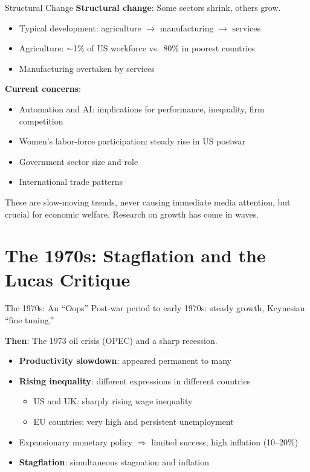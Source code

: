 \documentclass[blue]{beamer}
\begin{document}
\begin{frame}{Structural Change}
	\textbf{Structural change}: Some sectors shrink, others grow.
		\vspace{-6pt}
	\begin{itemize}
		\item Typical development: agriculture $\to$ manufacturing $\to$ services
		\item Agriculture: $\sim$1\% of US workforce vs.\ 80\% in poorest countries
		\item Manufacturing overtaken by services
	\end{itemize}

	\textbf{Current concerns}:
		\vspace{-6pt}
	\begin{itemize}
		\item Automation and AI: implications for performance, inequality, firm competition
		\item Women's labor-force participation: steady rise in US postwar 
		\item Government sector size and role
		\item International trade patterns
	\end{itemize}
	

	These are slow-moving trends, never causing immediate media attention, but crucial for economic welfare. Research on growth has come in waves.
\end{frame}

\section{The 1970s: Stagflation and the Lucas Critique}

\begin{frame}{The 1970s: An ``Oops''}
	Post-war period to early 1970s: steady growth, Keynesian ``fine tuning.''
	
	\bigskip
	\textbf{Then}: The 1973 oil crisis (OPEC) and a sharp recession.
	\begin{itemize}
		\item \textbf{Productivity slowdown}: appeared permanent to many
		\item \textbf{Rising inequality}: different expressions in different countries
		\begin{itemize}
			\item US and UK: sharply rising wage inequality
			\item EU countries: very high and persistent unemployment
		\end{itemize}
		\item Expansionary monetary policy $\Rightarrow$ limited success; high inflation (10--20\%)
		\item \textbf{Stagflation}: simultaneous stagnation and inflation
	\end{itemize}
\end{frame}
\end{document}
